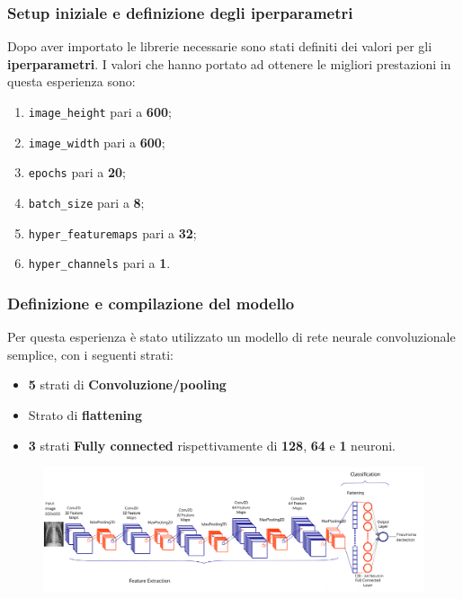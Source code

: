\documentclass{beamer}
\begin{document}
\begin{frame}
	\frametitle{Setup iniziale e definizione degli iperparametri}
	Dopo aver importato le librerie necessarie sono stati definiti dei valori per gli \textbf{iperparametri}. 
	I valori che hanno portato ad ottenere le migliori prestazioni in questa esperienza sono:
	\begin{enumerate}
		\item \lstinline[language = Python]{image_height} pari a \textbf{600};
		\item \lstinline[language = Python]{image_width} pari a \textbf{600};
		\item \lstinline[language = Python]{epochs} pari a \textbf{20};
		\item \lstinline[language = Python]{batch_size} pari a \textbf{8};
		\item \lstinline[language = Python]{hyper_featuremaps} pari a \textbf{32};
		\item \lstinline[language = Python]{hyper_channels} pari a \textbf{1}.
	\end{enumerate}

	
\end{frame}



\begin{frame}
	\frametitle{Definizione e compilazione del modello}
	Per questa esperienza è stato utilizzato un modello di rete neurale convoluzionale 
    semplice, con i seguenti strati:
	\begin{itemize}
		\item \textbf{5} strati di \textbf{Convoluzione/pooling}
		\item Strato di \textbf{flattening}
		\item \textbf{3} strati \textbf{Fully connected} rispettivamente di \textbf{128}, \textbf{64} e \textbf{1} neuroni.
	\end{itemize}

	\begin{figure}
		\includegraphics[width=1\textwidth]{pneumonia model.png}
	\end{figure}
		
	
\end{frame}
\end{document}
